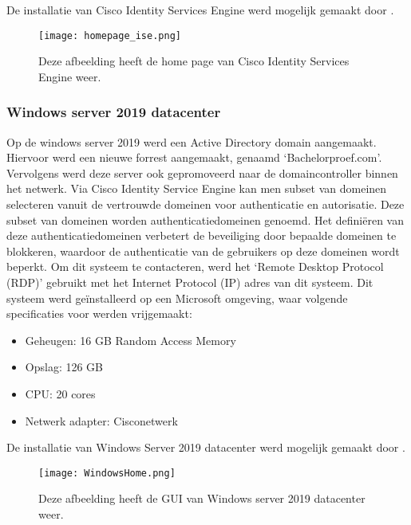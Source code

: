 \begin{itemize}
De installatie van Cisco Identity Services Engine werd mogelijk gemaakt door \cite{CiscoISE_InstallationGuide}.

\begin{figure}[H]
	\centering
	\texttt{[image: homepage\_ise.png]}
	\caption{Deze afbeelding heeft de home page van Cisco Identity Services Engine weer.}
\end{figure}

\subsubsection{Windows server 2019 datacenter}
Op de windows server 2019 werd een Active Directory domain aangemaakt. Hiervoor werd een nieuwe forrest aangemaakt, genaamd ‘Bachelorproef.com’. Vervolgens werd deze server ook gepromoveerd naar de domaincontroller binnen het netwerk.
\newline
\newline
Via Cisco Identity Service Engine kan men subset van domeinen selecteren vanuit de vertrouwde domeinen voor authenticatie en autorisatie. Deze subset van domeinen worden authenticatiedomeinen genoemd. Het definiëren van deze authenticatiedomeinen verbetert de beveiliging door bepaalde domeinen te blokkeren, waardoor de authenticatie van de gebruikers op deze domeinen wordt beperkt.
\newline
\newline
Om dit systeem te contacteren, werd het ‘Remote Desktop Protocol (RDP)’ gebruikt met het Internet Protocol (IP) adres van dit systeem.
\newline
\newline
Dit systeem werd geïnstalleerd op een Microsoft omgeving, waar volgende specificaties voor werden vrijgemaakt:

\begin{itemize}
	\item Geheugen: 16 GB Random Access Memory
	\item Opslag: 126 GB
	\item CPU: 20 cores
	\item Netwerk adapter: Cisco\textunderscore netwerk
\end{itemize}
De installatie van Windows Server 2019 datacenter werd mogelijk gemaakt door \cite{Win19_InstallationGuide}. 

\begin{figure}[H]
	\centering
	\texttt{[image: WindowsHome.png]}
	\caption{Deze afbeelding heeft de GUI van Windows server 2019 datacenter weer. }
\end{figure}


\end{itemize}
